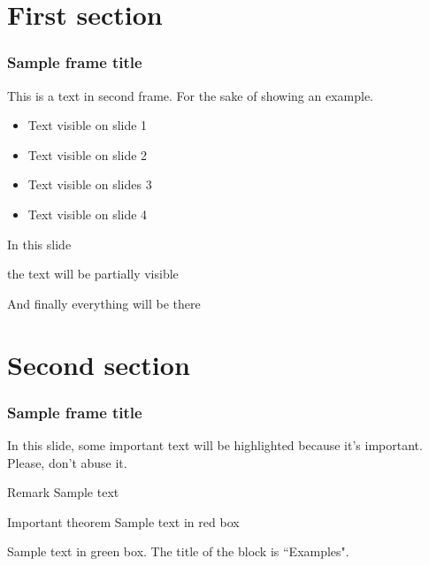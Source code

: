 \section{First section}

\begin{frame}
\frametitle{Sample frame title}
This is a text in second frame. For the sake of showing an example.

\begin{itemize}
    \item<1-> Text visible on slide 1
    \item<2-> Text visible on slide 2
    \item<3> Text visible on slides 3
    \item<4-> Text visible on slide 4
\end{itemize}
\end{frame}


\begin{frame}
In this slide \pause

the text will be partially visible \pause

And finally everything will be there
\end{frame}

\section{Second section}

\begin{frame}
\frametitle{Sample frame title}

In this slide, some important text will be
\alert{highlighted} because it's important.
Please, don't abuse it.

\begin{block}{Remark}
Sample text
\end{block}

\begin{alertblock}{Important theorem}
Sample text in red box
\end{alertblock}

\begin{examples}
Sample text in green box. The title of the block is ``Examples".
\end{examples}
\end{frame}


